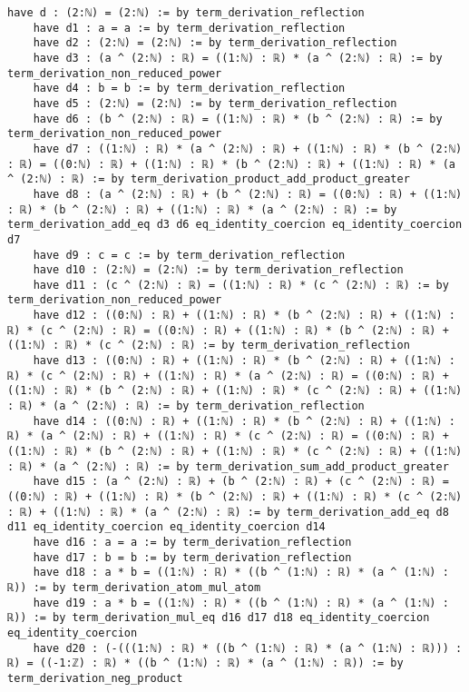 \documentclass{article}
\begin{document}
\begin{tcolorbox}[colback=white!10, width=\linewidth]
\begin{lstlisting}[language=Lean4]
    have d : (2:ℕ) = (2:ℕ) := by term_derivation_reflection
    have d1 : a = a := by term_derivation_reflection
    have d2 : (2:ℕ) = (2:ℕ) := by term_derivation_reflection
    have d3 : (a ^ (2:ℕ) : ℝ) = ((1:ℕ) : ℝ) * (a ^ (2:ℕ) : ℝ) := by term_derivation_non_reduced_power
    have d4 : b = b := by term_derivation_reflection
    have d5 : (2:ℕ) = (2:ℕ) := by term_derivation_reflection
    have d6 : (b ^ (2:ℕ) : ℝ) = ((1:ℕ) : ℝ) * (b ^ (2:ℕ) : ℝ) := by term_derivation_non_reduced_power
    have d7 : ((1:ℕ) : ℝ) * (a ^ (2:ℕ) : ℝ) + ((1:ℕ) : ℝ) * (b ^ (2:ℕ) : ℝ) = ((0:ℕ) : ℝ) + ((1:ℕ) : ℝ) * (b ^ (2:ℕ) : ℝ) + ((1:ℕ) : ℝ) * (a ^ (2:ℕ) : ℝ) := by term_derivation_product_add_product_greater
    have d8 : (a ^ (2:ℕ) : ℝ) + (b ^ (2:ℕ) : ℝ) = ((0:ℕ) : ℝ) + ((1:ℕ) : ℝ) * (b ^ (2:ℕ) : ℝ) + ((1:ℕ) : ℝ) * (a ^ (2:ℕ) : ℝ) := by term_derivation_add_eq d3 d6 eq_identity_coercion eq_identity_coercion d7
    have d9 : c = c := by term_derivation_reflection
    have d10 : (2:ℕ) = (2:ℕ) := by term_derivation_reflection
    have d11 : (c ^ (2:ℕ) : ℝ) = ((1:ℕ) : ℝ) * (c ^ (2:ℕ) : ℝ) := by term_derivation_non_reduced_power
    have d12 : ((0:ℕ) : ℝ) + ((1:ℕ) : ℝ) * (b ^ (2:ℕ) : ℝ) + ((1:ℕ) : ℝ) * (c ^ (2:ℕ) : ℝ) = ((0:ℕ) : ℝ) + ((1:ℕ) : ℝ) * (b ^ (2:ℕ) : ℝ) + ((1:ℕ) : ℝ) * (c ^ (2:ℕ) : ℝ) := by term_derivation_reflection
    have d13 : ((0:ℕ) : ℝ) + ((1:ℕ) : ℝ) * (b ^ (2:ℕ) : ℝ) + ((1:ℕ) : ℝ) * (c ^ (2:ℕ) : ℝ) + ((1:ℕ) : ℝ) * (a ^ (2:ℕ) : ℝ) = ((0:ℕ) : ℝ) + ((1:ℕ) : ℝ) * (b ^ (2:ℕ) : ℝ) + ((1:ℕ) : ℝ) * (c ^ (2:ℕ) : ℝ) + ((1:ℕ) : ℝ) * (a ^ (2:ℕ) : ℝ) := by term_derivation_reflection
    have d14 : ((0:ℕ) : ℝ) + ((1:ℕ) : ℝ) * (b ^ (2:ℕ) : ℝ) + ((1:ℕ) : ℝ) * (a ^ (2:ℕ) : ℝ) + ((1:ℕ) : ℝ) * (c ^ (2:ℕ) : ℝ) = ((0:ℕ) : ℝ) + ((1:ℕ) : ℝ) * (b ^ (2:ℕ) : ℝ) + ((1:ℕ) : ℝ) * (c ^ (2:ℕ) : ℝ) + ((1:ℕ) : ℝ) * (a ^ (2:ℕ) : ℝ) := by term_derivation_sum_add_product_greater
    have d15 : (a ^ (2:ℕ) : ℝ) + (b ^ (2:ℕ) : ℝ) + (c ^ (2:ℕ) : ℝ) = ((0:ℕ) : ℝ) + ((1:ℕ) : ℝ) * (b ^ (2:ℕ) : ℝ) + ((1:ℕ) : ℝ) * (c ^ (2:ℕ) : ℝ) + ((1:ℕ) : ℝ) * (a ^ (2:ℕ) : ℝ) := by term_derivation_add_eq d8 d11 eq_identity_coercion eq_identity_coercion d14
    have d16 : a = a := by term_derivation_reflection
    have d17 : b = b := by term_derivation_reflection
    have d18 : a * b = ((1:ℕ) : ℝ) * ((b ^ (1:ℕ) : ℝ) * (a ^ (1:ℕ) : ℝ)) := by term_derivation_atom_mul_atom
    have d19 : a * b = ((1:ℕ) : ℝ) * ((b ^ (1:ℕ) : ℝ) * (a ^ (1:ℕ) : ℝ)) := by term_derivation_mul_eq d16 d17 d18 eq_identity_coercion eq_identity_coercion
    have d20 : (-(((1:ℕ) : ℝ) * ((b ^ (1:ℕ) : ℝ) * (a ^ (1:ℕ) : ℝ))) : ℝ) = ((-1:ℤ) : ℝ) * ((b ^ (1:ℕ) : ℝ) * (a ^ (1:ℕ) : ℝ)) := by term_derivation_neg_product

\end{lstlisting}
\end{tcolorbox}
\end{document}
